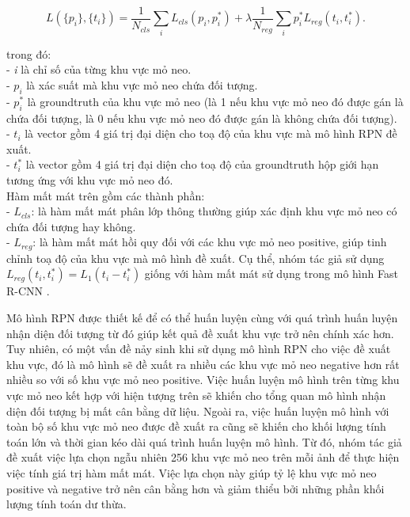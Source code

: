 {    \begin{equation}
        \label{eq:faster_rcnn_loss}
        L(\{p_i\}, \{t_i\}) = \frac{1}{N_{cls}}\sum_i L_{cls}(p_i, p^{*}_i) + \lambda\frac{1}{N_{reg}}\sum_i  p^{*}_i L_{reg}(t_i, t^{*}_i).
    \end{equation}

    \noindent
    trong đó: \\
    - \textit{i} là chỉ số của từng khu vực mỏ neo. \\
    - \textit{$p_i$} là xác suất mà khu vực mỏ neo chứa đối tượng. \\
    - \textit{$p^{*}_i$} là groundtruth của khu vực mỏ neo (là 1 nếu khu vực mỏ neo đó được gán là chứa đối tượng, là 0 nếu khu vực mỏ neo đó được gán là không chứa đối tượng). \\
    - \textit{$t_i$} là vector gồm 4 giá trị đại diện cho toạ độ của khu vực mà mô hình RPN đề xuất. \\
    - \textit{$t^{*}_i$} là vector gồm 4 giá trị đại diện cho toạ độ của groundtruth hộp giới hạn tương ứng với khu vực mỏ neo đó. \\
    Hàm mất mát trên gồm các thành phần: \\
    - \textit{$L_{cls}$}: là hàm mất mát phân lớp thông thường giúp xác định khu vực mỏ neo có chứa đối tượng hay không. \\
    - \textit{$L_{reg}$}: là hàm mất mát hồi quy đối với các khu vực mỏ neo positive, giúp tinh chỉnh toạ độ của khu vực mà mô hình đề xuất.
    Cụ thể, nhóm tác giả sử dụng $L_{reg}(t_i, t^{*}_i)=L_1(t_i - t^{*}_i)$ giống với hàm mất mát sử dụng trong mô hình Fast R-CNN \cite{girshick2015fast}.

    \noindent
    Mô hình RPN được thiết kế để có thể huấn luyện cùng với quá trình huấn luyện nhận diện đối tượng từ đó giúp kết quả đề xuất khu vực trở nên chính xác hơn.
    Tuy nhiên, có một vấn đề nảy sinh khi sử dụng mô hình RPN cho việc đề xuất khu vực, đó là mô hình sẽ đề xuất ra nhiều các khu vực mỏ neo negative hơn rất nhiều so với số khu vực mỏ neo positive.
    Việc huấn luyện mô hình trên từng khu vực mỏ neo kết hợp với hiện tượng trên sẽ khiến cho tổng quan mô hình nhận diện đối tượng bị mất cân bằng dữ liệu.
    Ngoài ra, việc huấn luyện mô hình với toàn bộ số khu vực mỏ neo được đề xuất ra cũng sẽ khiến cho khối lượng tính toán lớn và thời gian kéo dài quá trình huấn luyện mô hình.
    Từ đó, nhóm tác giả đề xuất việc lựa chọn ngẫu nhiên 256 khu vực mỏ neo trên mỗi ảnh để thực hiện việc tính giá trị hàm mất mát. Việc lựa chọn này giúp tỷ lệ khu vực mỏ neo positive và negative trở nên cân bằng hơn và giảm thiểu bởi những phần khối lượng tính toán dư thừa.

}
